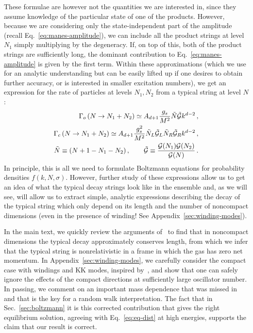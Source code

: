 \documentclass[a4paper,11pt]{article}
\newcommand{\lr}[1]{\left(#1\right)}
\begin{document}
These formulae are however not the quantities we are interested in, since they assume knowledge of the particular state of one of the products.
However, because we are considering only the state-independent part of the amplitude (recall Eq.~\eqref{eq:manes-amplitude}), we can include all the product strings at level $N_1$ simply multiplying by the degeneracy.
If, on top of this, both of the product strings are sufficiently long, the dominant contribution to Eq.~\eqref{eq:manes-amplitude} is given by the first term.
Within these approximations (which we use for an analytic understanding but can be easily lifted up if one desires to obtain further accuracy, or is interested in smaller excitation numbers), we get an expression for the rate of particles at levels $N_1,N_2$ from a typical string at level $N$:
\begin{equation}\label{eq:rate-N}
\begin{split}
    \Gamma_o\lr{N \rightarrow N_1+N_2}\simeq A_{d+1}\frac{g_s}{M^2}\Tilde{N}\Tilde{\mathcal{G}}k^{d-2} \, , \\
    \Gamma_{c}\lr{N \rightarrow N_1+N_2}\simeq A_{d+1} \frac{g_s^2}{M^2}\Tilde{N}_L\Tilde{\mathcal{G}}_L\Tilde{N}_R\Tilde{\mathcal{G}}_Rk^{d-2} \, , \\
    \Tilde{N}\equiv (N+1-N_1-N_2)\, , \qquad \Tilde{\mathcal{G}}\equiv  \frac{\mathcal{G}(N_1)\mathcal{G}(N_2)}{\mathcal{G}(N)}\, .
\end{split}
\end{equation}
In principle, this is all we need to formulate Boltzmann equations for probability densities $f(k,N,\sigma)$.
However, further study of these expressions allow us to get an idea of what the typical decay strings look like in the ensemble and, as we will see, will allow us to extract simple, analytic expressions describing the decay of the typical string which only depend on its length and the number of noncompact dimensions (even in the presence of winding! See Appendix~\ref{sec:winding-modes}).

In the main text, we quickly review the arguments of~\cite{Manes:2001cs} to find that in noncompact dimensions the typical decay approximately conserves length, from which we infer that the typical string is nonrelativistic in a frame in which the gas has zero net momentum. 
In Appendix~\ref{sec:winding-modes}, we carefully consider the compact case with windings and KK modes, inspired by~\cite{Chen:2005ra}, and show that one can safely ignore the effects of the compact directions at sufficiently large oscillator number.
In passing, we comment on an important mass dependence that was missed in~\cite{Chen:2005ra} and that is the key for a random walk interpretation.
The fact that in Sec.~\ref{sec:boltzmann} it is this corrected contribution that gives the right equilibrium solution, agreeing with Eq.~\eqref{eq:eq-dist} at high energies, supports the claim that our result is correct.
\\
\end{document}
